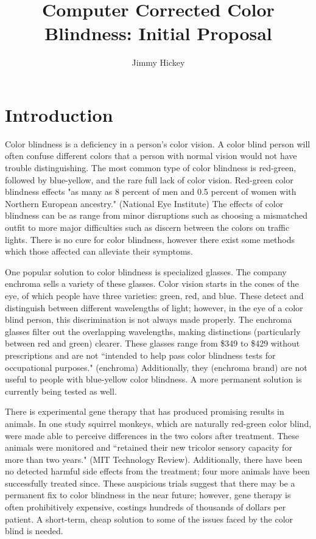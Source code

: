 \documentclass[12pt]{article}
\title{
Computer Corrected Color Blindness: Initial Proposal
}
\author{Jimmy Hickey}
\begin{document}
\maketitle
\doublespacing


\section{Introduction}

Color blindness is a deficiency in a person's color vision. A color blind person will often confuse different colors that a person with normal vision would not have trouble distinguishing. The most common type of color blindness is red-green, followed by blue-yellow, and the rare full lack of color vision. Red-green color blindness effects "as many as 8 percent of men and 0.5 percent of women with Northern European ancestry." (National Eye Institute) The effects of color blindness can be as range from minor disruptions such as choosing a mismatched outfit to more major difficulties such as discern between the colors on traffic lights.
There is no cure for color blindness, however there exist some methods which those affected can alleviate their symptoms. 

One popular solution to color blindness is specialized glasses. The company enchroma sells a variety of these glasses. Color vision starts in the cones of the eye, of which people have three varieties: green, red, and blue. These detect and distinguish between different wavelengths of light; however, in the eye of a color blind person, this discrimination is not always made properly. The enchroma glasses filter out the overlapping wavelengths, making distinctions (particularly between red and green) clearer. These glasses range from \$349 to \$429 without prescriptions and are not ``intended to help pass color blindness tests for occupational purposes." (enchroma) Additionally, they (enchroma brand) are not useful to people with blue-yellow color blindness. A more permanent solution is currently being tested as well.

There is experimental gene therapy that has produced promising results in animals. In one study squirrel monkeys, which are naturally red-green color blind, were made able to perceive differences in the two colors after treatment. These animals were monitored and ``retained their new tricolor sensory capacity for more than two years." (MIT Technology Review). Additionally, there have been no detected harmful side effects from the treatment; four more animals have been successfully treated since. These auspicious trials suggest that there may be a permanent fix to color blindness in the near future; however, gene therapy is often prohibitively expensive, costings hundreds of thousands of dollars per patient. A short-term, cheap solution to some of the issues faced by the color blind is needed. 
\end{document}
